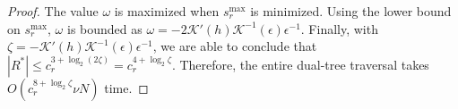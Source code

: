 \begin{proof}






The value $\omega$ is maximized when $s_r^{\max}$ is minimized.  Using the lower
bound on $s_r^{\max}$, $\omega$ is bounded as
%
$\omega = -2 \mathcal{K}'(h) \mathcal{K}^{-1}(\epsilon) \epsilon^{-1}$.
%
Finally, with $\zeta = -\mathcal{K}'(h) \mathcal{K}^{-1}(\epsilon)
\epsilon^{-1}$, we are able to conclude that $|R^*| \le c_r^{3 + \log_2 (2
\zeta)} = c_r^{4 + \log_2 \zeta}$.  Therefore, the entire dual-tree traversal
takes $O(c_r^{8 + \log_2 \zeta} \nu N)$ time.


\end{proof}
